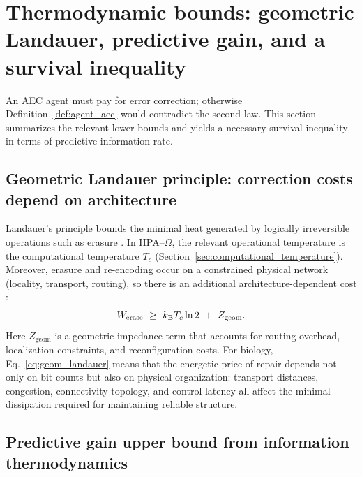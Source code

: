 \section{Thermodynamic bounds: geometric Landauer, predictive gain, and a survival inequality}
\label{sec:bounds}

An AEC agent must pay for error correction; otherwise Definition~\ref{def:agent_aec} would contradict the second law.
This section summarizes the relevant lower bounds and yields a necessary survival inequality in terms of predictive information rate.

\subsection{Geometric Landauer principle: correction costs depend on architecture}
\label{sec:geometric_landauer}

Landauer's principle bounds the minimal heat generated by logically irreversible operations such as erasure \cite{Landauer1961,Bennett1973}.
In HPA--$\Omega$, the relevant operational temperature is the computational temperature $T_c$ (Section~\ref{sec:computational_temperature}).
Moreover, erasure and re-encoding occur on a constrained physical network (locality, transport, routing), so there is an additional architecture-dependent cost \cite{Ma2025HPT}:
\begin{equation}
  W_{\mathrm{erase}}\ \ge\ \kB T_c\ln 2\ +\ Z_{\mathrm{geom}}.
  \label{eq:geom_landauer}
\end{equation}
Here $Z_{\mathrm{geom}}$ is a geometric impedance term that accounts for routing overhead, localization constraints, and reconfiguration costs.
For biology, Eq.~\eqref{eq:geom_landauer} means that the energetic price of repair depends not only on bit counts but also on physical organization: transport distances, congestion, connectivity topology, and control latency all affect the minimal dissipation required for maintaining reliable structure.

\subsection{Predictive gain upper bound from information thermodynamics}
\label{sec:predictive_gain}

